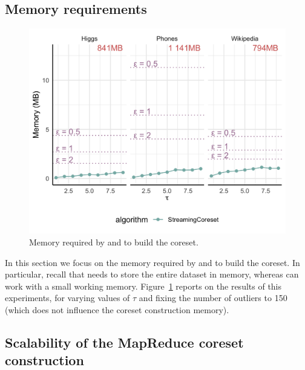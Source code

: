 \subsection{Memory requirements}
\label{sec:memory}

\begin{figure}
    \includegraphics[width=\columnwidth]{memory}
    \caption{\label{fig:memory}Memory required by \stream and \seq to build the coreset.}
\end{figure}

In this section we focus on the memory required by \seq and \stream to build the
coreset.
In particular, recall that \seq needs to store the entire dataset in memory, whereas \stream 
can work with a small working memory.
Figure~\ref{fig:memory} reports on the results of this experiments, for varying values of $\tau$
and fixing the number of outliers to 150 (which does not influence the coreset construction memory).


\subsection{Scalability of the MapReduce coreset construction}
\label{sec:exp:mapreduce}

